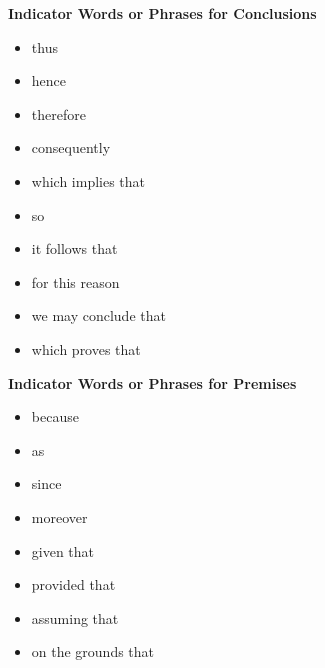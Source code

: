 \textbf{Indicator Words or Phrases for Conclusions}
\begin{itemize}
    \item thus
    \item hence
    \item therefore
    \item consequently
    \item which implies that
    \item so
    \item it follows that
    \item for this reason
    \item we may conclude that
    \item which proves that
\end{itemize}
\textbf{Indicator Words or Phrases for Premises}
\begin{itemize}
    \item because
    \item as
    \item since
    \item moreover
    \item given that
    \item provided that
    \item assuming that
    \item on the grounds that
\end{itemize}

